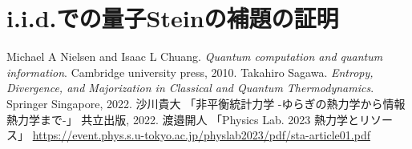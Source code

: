 \documentclass[report]{jlreq}
\begin{document}
\chapter{i.i.d.での量子Steinの補題の証明}
  
\begin{thebibliography}{99}
Michael A Nielsen and Isaac L Chuang. 
    \textit{Quantum computation and quantum information}.
    Cambridge university press, 2010.
Takahiro Sagawa. 
    \textit{Entropy, Divergence, and Majorization in Classical and Quantum Thermodynamics}. 
    Springer Singapore, 2022.
沙川貴大
    「非平衡統計力学 -ゆらぎの熱力学から情報熱力学まで-」
    共立出版, 2022. 
渡邉開人
    「Physics Lab. 2023 熱力学とリソース」
    \url{https://event.phys.s.u-tokyo.ac.jp/physlab2023/pdf/sta-article01.pdf}
\end{thebibliography}
  
\end{document}
